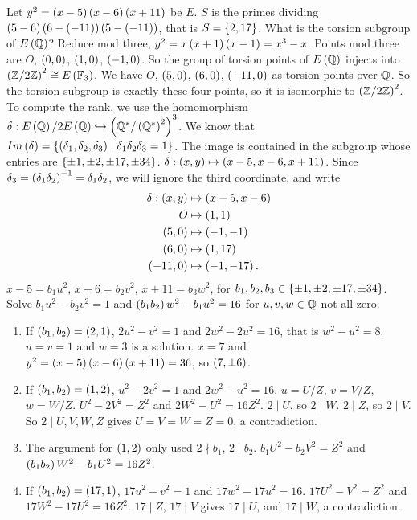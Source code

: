 Let $ y^2 = \left( x - 5 \right)\left( x - 6 \right)\left( x + 11 \right) $ be $ E $. $ S $ is the primes dividing $ \left( 5 - 6 \right)\left( 6 - \left( -11 \right) \right)\left( 5 - \left( -11 \right) \right) $, that is $ S = \left\{ 2, 17 \right\} $. What is the torsion subgroup of $ E\left( \mathbb{Q} \right) $? Reduce mod three, $ y^2 = x\left( x + 1 \right)\left( x - 1 \right) = x^3 - x $. Points mod three are $ O $, $ \left( 0, 0 \right) $, $ \left( 1, 0 \right) $, $ \left( -1, 0 \right) $. So the group of torsion points of $ E\left( \mathbb{Q} \right) $ injects into $ \left( \mathbb{Z} / 2\mathbb{Z} \right)^2 \cong E\left( \mathbb{F}_3 \right) $. We have $ O $, $ \left( 5, 0 \right) $, $ \left( 6, 0 \right) $, $ \left( -11, 0 \right) $ as torsion points over $ \mathbb{Q} $. So the torsion subgroup is exactly these four points, so it is isomorphic to $ \left( \mathbb{Z} / 2\mathbb{Z} \right)^2 $. To compute the rank, we use the homomorphism $ \delta : E\left( \mathbb{Q} \right) / 2E\left( \mathbb{Q} \right) \hookrightarrow \left( \mathbb{Q}^* / \left( \mathbb{Q}^* \right)^2 \right)^3 $. We know that $ Im\left( \delta \right) = \left\{ \left( \delta_1, \delta_2, \delta_3 \right) \mid \delta_1\delta_2\delta_3 = 1 \right\} $. The image is contained in the subgroup whose entries are $ \left\{ \pm 1, \pm 2, \pm 17, \pm 34 \right\} $. $ \delta : \left( x, y \right) \mapsto \left( x - 5, x - 6, x + 11 \right) $. Since $ \delta_3 = \left( \delta_1\delta_2 \right)^{-1} = \delta_1\delta_2 $, we will ignore the third coordinate, and write
\begin{align*}
\delta : \left( x, y \right) & \mapsto \left( x - 5, x - 6 \right) \\
O & \mapsto \left( 1, 1 \right) \\
\left( 5, 0 \right) & \mapsto \left( -1, -1 \right) \\
\left( 6, 0 \right) & \mapsto \left( 1, 17 \right) \\
\left( -11, 0 \right) & \mapsto \left( -1, -17 \right).
\end{align*}
$ x - 5 = b_1u^2 $, $ x - 6 = b_2v^2 $, $ x + 11 = b_3w^2 $, for $ b_1, b_2, b_3 \in \left\{ \pm 1, \pm 2, \pm 17, \pm 34 \right\} $. Solve $ b_1u^2 - b_2v^2 = 1 $ and $ \left( b_1b_2 \right)w^2 - b_1u^2 = 16 $ for $ u, v, w \in \mathbb{Q} $ not all zero.
\begin{enumerate}
\item If $ \left( b_1, b_2 \right) = \left( 2, 1 \right) $, $ 2u^2 - v^2 = 1 $ and $ 2w^2 - 2u^2 = 16 $, that is $ w^2 - u^2 = 8 $. $ u = v = 1 $ and $ w = 3 $ is a solution. $ x = 7 $ and $ y^2 = \left( x - 5 \right)\left( x - 6 \right)\left( x + 11 \right) = 36 $, so $ \left( 7, \pm 6 \right) $.
\item If $ \left( b_1, b_2 \right) = \left( 1, 2 \right) $, $ u^2 - 2v^2 = 1 $ and $ 2w^2 - u^2 = 16 $. $ u = U / Z $, $ v = V / Z $, $ w = W / Z $. $ U^2 - 2V^2 = Z^2 $ and $ 2W^2 - U^2 = 16Z^2 $. $ 2 \mid U $, so $ 2 \mid W $. $ 2 \mid Z $, so $ 2 \mid V $. So $ 2 \mid U, V, W, Z $ gives $ U = V = W = Z = 0 $, a contradiction.
\item The argument for $ \left( 1, 2 \right) $ only used $ 2 \nmid b_1 $, $ 2 \mid b_2 $. $ b_1U^2 - b_2V^2 = Z^2 $ and $ \left( b_1b_2 \right)W^2 - b_1U^2 = 16Z^2 $.
\item If $ \left( b_1, b_2 \right) = \left( 17, 1 \right) $, $ 17u^2 - v^2 = 1 $ and $ 17w^2 - 17u^2 = 16 $. $ 17U^2 - V^2 = Z^2 $ and $ 17W^2 - 17U^2 = 16Z^2 $. $ 17 \mid Z $, $ 17 \mid V $ gives $ 17 \mid U $, and $ 17 \mid W $, a contradiction.
\end{enumerate}
